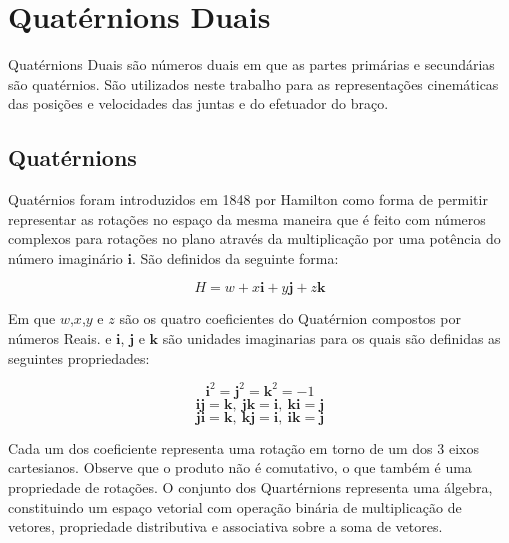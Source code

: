 
\section{Quatérnions Duais}

Quatérnions Duais são números duais em que as partes primárias e secundárias são quatérnios. São utilizados neste trabalho para as representações cinemáticas das posições e velocidades das juntas e do efetuador do braço.

\subsection{Quatérnions}
Quatérnios foram introduzidos em 1848 por Hamilton \cite{hamilton1848xi} como forma de permitir representar as rotações no espaço da mesma maneira que é feito com números complexos para rotações no plano através da multiplicação por uma potência do número imaginário $\mathbf{i}$. São definidos da seguinte forma:

\begin{equation}
    H = w + x\mathbf{{i}} + y\mathbf{{j}} + z\mathbf{{k}}
\end{equation}

Em que $w$,$x$,$y$ e $z$ são os quatro coeficientes do Quatérnion compostos por números Reais. e $\mathbf{{i}}$, $\mathbf{{j}}$ e $\mathbf{{k}}$ são unidades imaginarias para os quais são definidas as seguintes propriedades:

\begin{equation}
    \mathbf{{i}}^2 = \mathbf{{j}}^2 = \mathbf{{k}}^2 = -1
\end{equation}
\begin{equation}
    \mathbf{i}\mathbf{j} = \mathbf{k},\ \mathbf{j}\mathbf{k} = \mathbf{i},\ \mathbf{k}\mathbf{i} = \mathbf{j}
\end{equation}
\begin{equation}
    \mathbf{j}\mathbf{i} = \mathbf{k},\ \mathbf{k}\mathbf{j} = \mathbf{i},\ \mathbf{i}\mathbf{k} = \mathbf{j}
\end{equation}

Cada um dos coeficiente representa uma rotação em torno de um dos 3 eixos cartesianos. Observe que o produto não é comutativo, o que também é uma propriedade de rotações. O conjunto dos Quartérnions representa uma álgebra, constituindo um espaço vetorial com operação binária de multiplicação de vetores, propriedade distributiva e associativa sobre a soma de vetores. 

